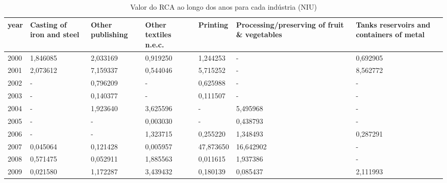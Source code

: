 \begin{table}
\centering
\caption{Valor do RCA ao longo dos anos para cada indústria (NIU)}
\begin{tabular}{p{1cm}p{2cm}p{2cm}p{2cm}p{2cm}p{2cm}p{2cm}}
\toprule
 year &  Casting of iron and steel &  Other publishing &  Other textiles n.e.c. &   Printing &  Processing/preserving of fruit \& vegetables &  Tanks reservoirs and containers of metal \\
\midrule
 2000 &                   1,846085 &          2,033169 &               0,919250 &   1,244253 &                                            - &                                  0,692905 \\
 2001 &                   2,073612 &          7,159337 &               0,544046 &   5,715252 &                                            - &                                  8,562772 \\
 2002 &                          - &          0,796209 &                      - &   0,625988 &                                            - &                                         - \\
 2003 &                          - &          0,140377 &                      - &   0,111507 &                                            - &                                         - \\
 2004 &                          - &          1,923640 &               3,625596 &          - &                                     5,495968 &                                         - \\
 2005 &                          - &                 - &               0,003030 &          - &                                     0,438793 &                                         - \\
 2006 &                          - &                 - &               1,323715 &   0,255220 &                                     1,348493 &                                  0,287291 \\
 2007 &                   0,045064 &          0,121428 &               0,005957 &  47,873650 &                                    16,642902 &                                         - \\
 2008 &                   0,571475 &          0,052911 &               1,885563 &   0,011615 &                                     1,937386 &                                         - \\
 2009 &                   0,021580 &          1,172287 &               3,439432 &   0,180139 &                                     0,085437 &                                  2,111993 \\

\end{tabular}
\end{table}
